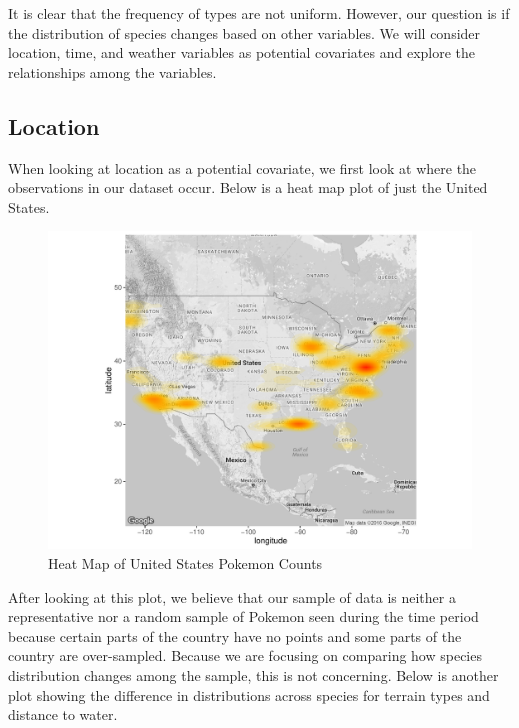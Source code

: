 \documentclass{article}
\begin{document}
\noindent It is clear that the frequency of types are not uniform. However, our question is if the distribution of species changes based on other variables. We will consider location, time, and weather variables as potential covariates and explore the relationships among the variables.

\subsection{Location}
When looking at location as a potential covariate, we first look at where the observations in our dataset occur. Below is a heat map plot of just the United States.

\begin{figure}[H]
\centering
\includegraphics[scale = 0.45]{heatmap.pdf}
\caption{Heat Map of United States Pokemon Counts}
\end{figure}

\noindent After looking at this plot, we believe that our sample of data is neither a representative nor a random sample of Pokemon seen during the time period because certain parts of the country have no points and some parts of the country are over-sampled. Because we are focusing on comparing how species distribution changes among the sample, this is not concerning. Below is another plot showing the difference in distributions across species for terrain types and distance to water.
\end{document}
